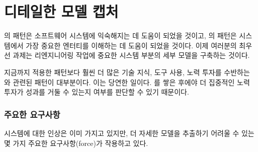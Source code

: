 \documentclass[a4paper,10pt,twoside]{book}
\begin{document}
	\renewcommand{\nnbb}[2]{} %
	\sloppy
\fi
\chapter{디테일한 모델 캡처}

의 패턴은 소프트웨어 시스템에 익숙해지는 데 도움이 되었을 것이고, 의 패턴은 시스템에서 가장 중요한 엔터티를 이해하는 데 도움이 되었을 것이다. 이제 여러분의 최우선 과제는 리엔지니어링 작업에 중요한 시스템 부분의 세부 모델을 구축하는 것이다.

지금까지 적용한 패턴보다 훨씬 더 많은 기술 지식, 도구 사용, 노력 투자를 수반하는 와 관련된 패턴이 대부분이다. 이는 당연한 일이다. 를 쌓은 후에야 더 집중적인 노력 투자가 성과를 거둘 수 있는지 여부를 판단할 수 있기 때문이다.

\subsection*{주요한 요구사항}

시스템에 대한 인상은 이미 가지고 있지만, 더 자세한 모델을 추출하기 어려울 수 있는 몇 가지 주요한 요구사항(force)가 작용하고 있다.
\end{document}
